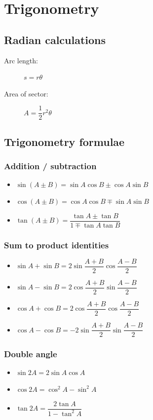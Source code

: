 \documentclass[A4paper]{article}
\begin{document}
	\pagebreak

	\section{Trigonometry}
	\subsection{Radian calculations}
	\begin{description}
		\item[Arc length:] $s=r\theta$
		\item[Area of sector:] $A=\dfrac{1}{2}r^2\theta$
	\end{description}

	\subsection{Trigonometry formulae}
	\subsubsection{Addition / subtraction}
	\begin{itemize}
		\item $\sin (A \pm B) = \sin A \cos B \pm \cos A \sin B$
		\item $\cos (A \pm B) = \cos A \cos B \mp \sin A \sin B$
		\item $\tan (A \pm B) = \dfrac{\tan A \pm \tan B}{1 \mp \tan A \tan B}$
	\end{itemize}
	\subsubsection{Sum to product identities}
	\begin{itemize}
		\item $\sin A + \sin B = 2\sin \dfrac{A+B}{2} \cos\dfrac{A-B}{2}$
		\item $\sin A - \sin B = 2\cos \dfrac{A+B}{2} \sin\dfrac{A-B}{2}$
		\item $\cos A + \cos B = 2\cos \dfrac{A+B}{2} \cos\dfrac{A-B}{2}$
		\item $\cos A - \cos B = -2\sin \dfrac{A+B}{2} \sin\dfrac{A-B}{2}$
	\end{itemize}
	\subsubsection{Double angle}
	\begin{itemize}
		\item $\sin 2A = 2\sin A \cos A$
		\item $\cos 2A = \cos^2 A - \sin^2 A$
		\item $\tan 2A = \dfrac{2\tan A}{1-\tan^2 A}$
	\end{itemize}
\end{document}
